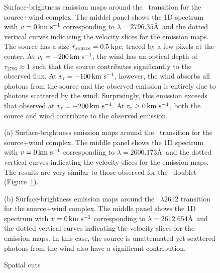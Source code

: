 \documentclass[12pt,preprint]{aastex}
\begin{document}
\begin{figure}
\caption{
Surface-brightness emission maps around the \mgiia\ transition for the
source+wind complex.  The middel panel shows the 1D spectrum with $v=0
\, {\rm km~s^{-1}}$ corresponding to $\lambda = 2796.35$\AA\ and the dotted vertical
curves indicating the velocity slices for the emission maps.  The
source has a size $r_{\rm source} = 0.5$\,kpc, traced by a few
pixels at the center.   At $v_{\rm r}=-200 \, {\rm km~s^{-1}}$, the wind has an optical
depth of $\tau_{2796} \approx 1$ such that the source contributes
significantly to the observed flux.  At $v_{\rm r}=-100 \, {\rm km~s^{-1}}$, however, the
wind absorbs all photons from the source and the observed emission is
entirely due to photons scattered by the wind.  Surprisingly, this
emission exceeds that observed at $v_{\rm r} = -200\, {\rm km~s^{-1}}$. At $v_{\rm r} \ge 0
\, {\rm km~s^{-1}}$,  both the source and wind contribute to the observed emission.
}
\label{fig:fiducial_ifu_mgii}
\end{figure}

\begin{figure}
\caption{
(a) Surface-brightness emission maps around the \feiib\ transition for the
source+wind complex.  The middle panel shows the 1D spectrum with $v=0
\, {\rm km~s^{-1}}$ corresponding to $\lambda = 2600.173$\AA\ and the dotted vertical
curves indicating the velocity slices for the emission maps.  
The results are very similar to those observed for the \mgiid\ doublet
(Figure~\ref{fig:fiducial_ifu_mgii}).
}
\label{fig:fiducial_ifu_feii2600}
\end{figure}

\begin{figure*}
\caption{
(b) Surface-brightness emission maps around the ~$\lambda 2612$ transition for the
source+wind complex.  The middle panel shows the 1D spectrum with $v=0
\, {\rm km~s^{-1}}$ corresponding to $\lambda = 2612.654$\AA\ and the dotted vertical
curves indicating the velocity slices for the emission maps.  
In this case, the source is unattenuated yet scattered photons from
the wind also have a significant contribution. 
}
\label{fig:fiducial_ifu_feii2612}
\end{figure*}

\begin{figure}
\caption{
Spatial cuts
}
\label{fig:fiducial_cuts}
\end{figure}
\end{document}
